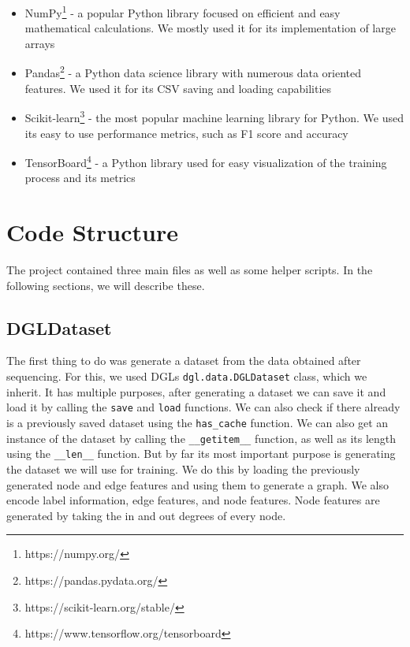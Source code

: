 \documentclass[times, utf8, diplomski, english]{fer_eng}
\begin{document}
\begin{itemize}
	\item NumPy\footnote{https://numpy.org/} - a popular Python library focused on efficient and easy mathematical calculations. We mostly used it for its implementation of large arrays

	\item Pandas\footnote{https://pandas.pydata.org/} - a Python data science library with numerous data oriented features. We used it for its CSV saving and loading capabilities

	\item Scikit-learn\footnote{https://scikit-learn.org/stable/} - the most popular machine learning library for Python. We used its easy to use performance metrics, such as F1 score and accuracy

	\item TensorBoard\footnote{https://www.tensorflow.org/tensorboard} - a Python library used for easy visualization of the training process and its metrics
\end{itemize}

\section{Code Structure}
\label{sec:code structure}

The project contained three main files as well as some helper scripts. In the following sections, we will describe these.

\subsection{DGLDataset}

The first thing to do was generate a dataset from the data obtained after sequencing. For this, we used DGLs \texttt{dgl.data.DGLDataset} class, which we inherit. It has multiple purposes, after generating a dataset we can save it and load it by calling the \texttt{save} and \texttt{load} functions. We can also check if there already is a previously saved dataset using the \texttt{has\_cache} function. We can also get an instance of the dataset by calling the \texttt{\_\_getitem\_\_} function, as well as its length using the \texttt{\_\_len\_\_} function. But by far its most important purpose is generating the dataset we will use for training. We do this by loading the previously generated node and edge features and using them to generate a graph. We also encode label information, edge features, and node features. Node features are generated by taking the in and out degrees of every node.
\end{document}
